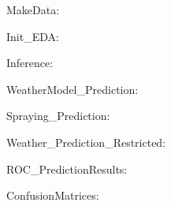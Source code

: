\documentclass[12pt]{article}
\begin{document}
MakeData:

Init\_EDA:

Inference:

WeatherModel\_Prediction:

Spraying\_Prediction:

Weather\_Prediction\_Restricted:

ROC\_PredictionResults:

ConfusionMatrices:


\newpage
\nocite{*}


\end{document}

